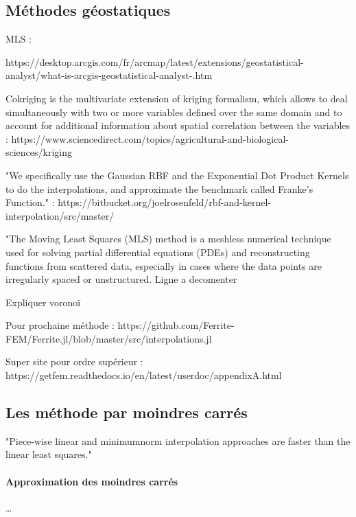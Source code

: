 
\subsection{Méthodes géostatiques}

MLS : \cite{levin}

https://desktop.arcgis.com/fr/arcmap/latest/extensions/geostatistical-analyst/what-is-arcgis-geostatistical-analyst-.htm

Cokriging is the multivariate extension of kriging formalism, which allows to deal simultaneously with two or more variables defined over the same domain and to account for additional information about spatial correlation between the variables :
https://www.sciencedirect.com/topics/agricultural-and-biological-sciences/kriging


"We specifically use the Gaussian RBF and the Exponential Dot Product Kernels to do the interpolations, and approximate the benchmark called Franke's Function." : https://bitbucket.org/joelrosenfeld/rbf-and-kernel-interpolation/src/master/

"The Moving Least Squares (MLS) method is a meshless numerical technique used for solving partial differential equations (PDEs) and reconstructing functions from scattered data, especially in cases where the data points are irregularly spaced or unstructured.
Ligne a decomenter%


Expliquer voronoï

Pour prochaine méthode :
https://github.com/Ferrite-FEM/Ferrite.jl/blob/master/src/interpolations.jl


Super site pour ordre supérieur : https://getfem.readthedocs.io/en/latest/userdoc/appendixA.html

\subsection{Les méthode par moindres carrés}

"Piece-wise linear and minimumnorm interpolation approaches are faster than the linear least squares."\cite{muller2020}

\paragraph{Approximation des moindres carrés}
\vspace{0.5cm}
\dots
